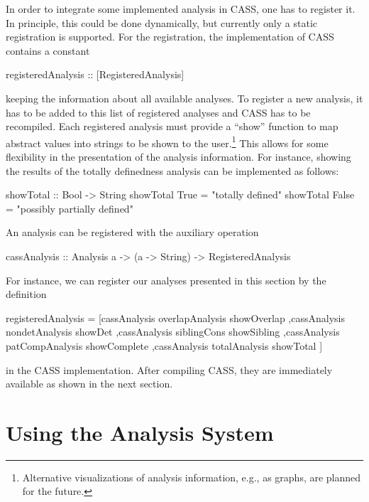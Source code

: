 \documentclass{llncs}
\begin{document}
In order to integrate some implemented analysis in CASS,
one has to register it. In principle, this could be done dynamically,
but currently only a static registration is supported.
For the registration, the implementation of CASS contains a constant
\begin{curry}
registeredAnalysis :: [RegisteredAnalysis]
\end{curry}
keeping the information about all available analyses.
To register a new analysis, it has to be added to this list of
registered analyses and CASS has to be recompiled.
Each registered analysis must provide a ``show'' function
to map abstract values into strings to be shown to the user.\footnote{Alternative visualizations of analysis information, e.g., as graphs,
are planned for the future.}
This allows for some flexibility in the presentation of the analysis information.
For instance, showing the results of the totally definedness analysis
can be implemented as follows:
\begin{curry}
showTotal :: Bool -> String
showTotal True  = "totally defined"
showTotal False = "possibly partially defined"
\end{curry}
An analysis can be registered with the auxiliary operation
\begin{curry}
cassAnalysis :: Analysis a -> (a -> String) -> RegisteredAnalysis
\end{curry}
For instance, we can register our analyses presented in this section
by the definition
\begin{curry}
registeredAnalysis = [cassAnalysis overlapAnalysis  showOverlap
                     ,cassAnalysis nondetAnalysis   showDet
                     ,cassAnalysis siblingCons      showSibling
                     ,cassAnalysis patCompAnalysis  showComplete
                     ,cassAnalysis totalAnalysis    showTotal    ]
\end{curry}
in the CASS implementation.
After compiling CASS, they are immediately available
as shown in the next section.


\section{Using the Analysis System}
\label{sec:usage}
\end{document}
